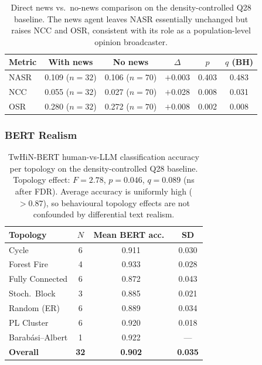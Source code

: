 \documentclass[11pt]{article}
\begin{document}
\begin{table}[h]
\centering
\small
\begin{tabular}{lccccc}
\toprule
Metric & With news & No news & $\Delta$ & $p$ & $q$ (BH) \\
\midrule
NASR & 0.109 ($n=32$) & 0.106 ($n=70$) & $+$0.003 & 0.403 & 0.483 \\
NCC  & 0.055 ($n=32$) & 0.027 ($n=70$) & $+$0.028 & 0.008 & 0.031 \\
OSR  & 0.280 ($n=32$) & 0.272 ($n=70$) & $+$0.008 & 0.002 & 0.008 \\
\bottomrule
\end{tabular}
\caption{Direct news vs.\ no-news comparison on the density-controlled Q28 baseline. The news agent leaves NASR essentially unchanged but raises NCC and OSR, consistent with its role as a population-level opinion broadcaster.}
\label{tab:phase3_news_vs_nonews}
\end{table}

\subsubsection{BERT Realism}

\begin{table}[h]
\centering
\small
\begin{tabular}{lccc}
\toprule
Topology & $N$ & Mean BERT acc.\ & SD \\
\midrule
Cycle                & 6 & 0.911 & 0.030 \\
Forest Fire          & 4 & 0.933 & 0.028 \\
Fully Connected      & 6 & 0.872 & 0.043 \\
Stoch.\ Block        & 3 & 0.885 & 0.021 \\
Random (ER)          & 6 & 0.889 & 0.034 \\
PL Cluster           & 6 & 0.920 & 0.018 \\
Barab\'{a}si--Albert & 1 & 0.922 & --- \\
\textbf{Overall}     & \textbf{32} & \textbf{0.902} & \textbf{0.035} \\
\bottomrule
\end{tabular}
\caption{TwHiN-BERT human-vs-LLM classification accuracy per topology on the density-controlled Q28 baseline. Topology effect: $F=2.78$, $p=0.046$, $q=0.089$ (ns after FDR). Average accuracy is uniformly high ($>0.87$), so behavioural topology effects are not confounded by differential text realism.}
\label{tab:phase3_bert}
\end{table}
\end{document}
